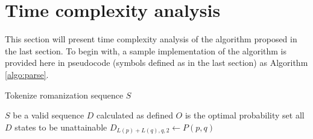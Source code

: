 \documentclass[a4paper,11pt,twocolumn]{article}
\begin{document}
\section{Time complexity analysis}

This section will present time complexity analysis of the algorithm proposed in the last section. To begin with, a sample implementation of the algorithm is provided here in pseudocode (symbols defined as in the last section) as Algorithm \ref{algo:parse}.

\begin{algorithm}
\caption{Tokenize romanization sequence $S$}
\label{algo:parse}

\begin{algorithmic}
\REQUIRE $S$ be a valid sequence
\ENSURE $D$ calculated as defined
\ENSURE $O$ is the optimal probability
\STATE set all $D$ states to be unattainable
        \STATE $D_{L(p)+L(q),q,2} \leftarrow P(p,q)$
      \ENDIF
    \ENDIF
  \ENDFOR
\ENDFOR
{}
    \ENDIF
        \ENDIF
        \ENDIF
        \ENDIF
        \ENDIF
      \ENDFOR
    \ENDFOR
  \ENDFOR
\ENDFOR
\end{algorithmic}

\end{algorithm}

\end{document}
